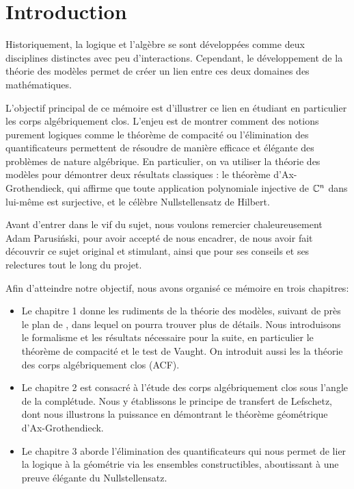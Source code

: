 \chapter*{Introduction}

Historiquement, la logique et l'algèbre se sont développées comme deux
disciplines distinctes avec peu d'interactions. Cependant, le développement de
la théorie des modèles permet de créer un lien entre ces deux domaines des mathématiques.

L'objectif principal de ce mémoire est d'illustrer ce lien en étudiant en
particulier les corps algébriquement clos. L'enjeu est de montrer comment des
notions purement logiques comme le théorème de compacité ou l'élimination des
quantificateurs permettent de résoudre de manière efficace et élégante des problèmes de
nature algébrique. En particulier, on va utiliser la théorie des modèles pour démontrer deux résultats
classiques : le théorème d'Ax-Grothendieck, qui affirme que toute application polynomiale
injective de $\mathbb{C}^n$ dans lui-même est surjective, et le célèbre Nullstellensatz
de Hilbert.

Avant d'entrer dans le vif du sujet, nous voulons remercier chaleureusement Adam
Parusiński, pour avoir accepté de nous encadrer, de nous avoir fait découvrir ce
sujet original et stimulant, ainsi que pour ses conseils et ses relectures tout
le long du projet.

Afin d'atteindre notre objectif, nous avons organisé ce mémoire en trois
chapitres:

\begin{itemize}
    \item Le chapitre 1 donne les rudiments de la théorie des modèles, suivant de près
    le plan de \cite{Marker_2002}, dans lequel on pourra trouver plus de détails. Nous
    introduisons le formalisme et les résultats nécessaire pour la suite, en particulier 
    le théorème de compacité et le test de Vaught. On introduit aussi les la
    théorie des corps algébriquement clos (ACF).
    \item Le chapitre 2 est consacré à l'étude des corps algébriquement clos sous l'angle de
    la complétude. Nous y établissons le principe de transfert de Lefschetz, dont nous illustrons la puissance en démontrant le théorème géométrique d'Ax-Grothendieck.
    \item Le chapitre 3 aborde l'élimination des quantificateurs qui nous permet de lier la logique à la géométrie via les ensembles constructibles, aboutissant à une preuve élégante du Nullstellensatz.
\end{itemize}

